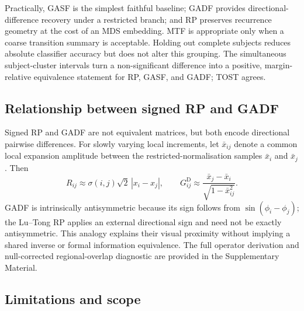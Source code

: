 \documentclass[5p]{elsarticle}
\begin{document}
Practically, GASF is the simplest faithful baseline; GADF provides directional-difference recovery under a restricted branch; and RP preserves recurrence geometry at the cost of an MDS embedding. MTF is appropriate only when a coarse transition summary is acceptable. Holding out complete subjects reduces absolute classifier accuracy but does not alter this grouping. The simultaneous subject-cluster intervals turn a non-significant difference into a positive, margin-relative equivalence statement for RP, GASF, and GADF; TOST agrees.

\subsection{Relationship between signed RP and GADF}\label{sec:disc_structural}

Signed RP and GADF are not equivalent matrices, but both encode directional pairwise differences. For slowly varying local increments, let \(\bar x_{ij}\) denote a common local expansion amplitude between the restricted-normalisation samples \(\bar x_i\) and \(\bar x_j\). Then
\[
R_{ij}\approx \sigma(i,j)\sqrt2\,|x_i-x_j|,
\qquad
G^{\mathrm D}_{ij}\approx
\frac{\bar x_j-\bar x_i}{\sqrt{1-\bar x_{ij}^2}}.
\]
GADF is intrinsically antisymmetric because its sign follows from \(\sin(\phi_i-\phi_j)\); the Lu--Tong RP applies an external directional sign and need not be exactly antisymmetric. This analogy explains their visual proximity without implying a shared inverse or formal information equivalence. The full operator derivation and null-corrected regional-overlap diagnostic are provided in the Supplementary Material.

\subsection{Limitations and scope}\label{sec:disc_scope}
\end{document}
